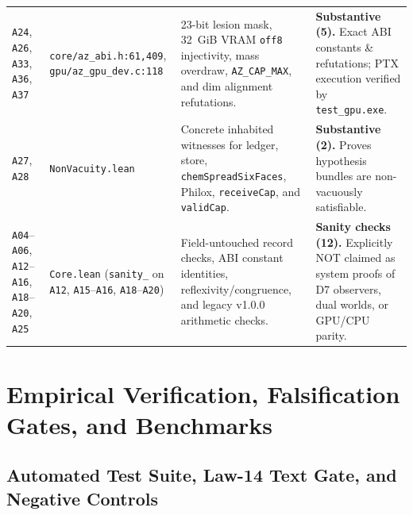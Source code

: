 \documentclass[11pt,reqno]{amsart}
\newcommand{\code}[1]{\texttt{\footnotesize #1}}
\newcommand{\us}{\_\allowbreak}
\newcommand{\slsh}{/\allowbreak}
\begin{document}
\begin{table}[htbp]
\begin{tabularx}{\textwidth}{L{2.15cm}L{3.00cm}L{3.95cm}Y}
\code{A24}, \code{A26}, \code{A33}, \code{A36}, \code{A37} & \code{core\slsh az\us abi.h:61,409}, \code{gpu\slsh az\us gpu\us dev.c:118} & 23-bit lesion mask, 32~GiB VRAM \code{off8} injectivity, mass overdraw, \code{AZ\us CAP\us MAX}, and dim alignment refutations. & \textbf{Substantive (5).} Exact ABI constants \& refutations; PTX execution verified by \code{test\us gpu.exe}. \\
\code{A27}, \code{A28} & \code{NonVacuity.lean} & Concrete inhabited witnesses for ledger, store, \code{chem\allowbreak Spread\allowbreak Six\allowbreak Faces}, Philox, \code{receiveCap}, and \code{validCap}. & \textbf{Substantive (2).} Proves hypothesis bundles are non-vacuously satisfiable. \\
\code{A04}--\code{A06}, \code{A12}--\code{A16}, \code{A18}--\code{A20}, \code{A25} & \code{Core.lean} (\code{sanity\us*} on \code{A12}, \code{A15}--\code{A16}, \code{A18}--\code{A20}) & Field-untouched record checks, ABI constant identities, reflexivity/congruence, and legacy v1.0.0 arithmetic checks. & \textbf{Sanity checks (12).} Explicitly NOT claimed as system proofs of D7 observers, dual worlds, or GPU/CPU parity. \\
\bottomrule
\end{tabularx}
\end{table}

\section{Empirical Verification, Falsification Gates, and Benchmarks}

\subsection{Automated Test Suite, Law-14 Text Gate, and Negative Controls}
\end{document}
